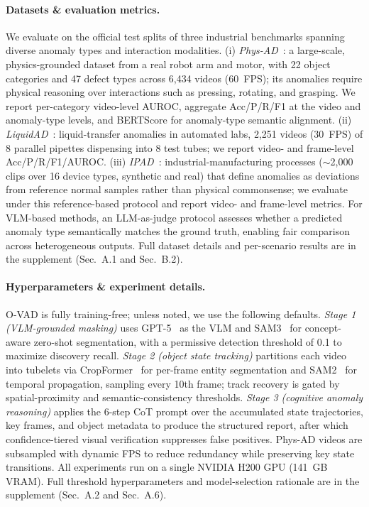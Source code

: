\documentclass[runningheads]{llncs}
\begin{document}
\paragraph{\textbf{Datasets \& evaluation metrics.}}
We evaluate on the official test splits of three industrial benchmarks spanning diverse anomaly types and interaction modalities. (i) \textit{Phys-AD}~\cite{li2025towards}: a large-scale, physics-grounded dataset from a real robot arm and motor, with 22 object categories and 47 defect types across 6,434 videos (60~FPS); its anomalies require physical reasoning over interactions such as pressing, rotating, and grasping. We report per-category video-level AUROC, aggregate Acc/P/R/F1 at the video and anomaly-type levels, and BERTScore for anomaly-type semantic alignment. (ii) \textit{LiquidAD}~\cite{dabouei2025deep}: liquid-transfer anomalies in automated labs, 2,251 videos (30~FPS) of 8 parallel pipettes dispensing into 8 test tubes; we report video- and frame-level Acc/P/R/F1/AUROC. (iii) \textit{IPAD}~\cite{liu2024ipad}: industrial-manufacturing processes ($\sim$2{,}000 clips over 16 device types, synthetic and real) that define anomalies as deviations from reference normal samples rather than physical commonsense; we evaluate under this reference-based protocol and report video- and frame-level metrics. For VLM-based methods, an LLM-as-judge protocol assesses whether a predicted anomaly type semantically matches the ground truth, enabling fair comparison across heterogeneous outputs. Full dataset details and per-scenario results are in the supplement (Sec.~A.1 and Sec.~B.2).



\paragraph{\textbf{Hyperparameters \& experiment details.}}

O-VAD is fully training-free; unless noted, we use the following defaults. \textit{Stage 1 (VLM-grounded masking)} uses GPT-5~\cite{singh2025openai} as the VLM and SAM3~\cite{carion2025sam} for concept-aware zero-shot segmentation, with a permissive detection threshold of 0.1 to maximize discovery recall. \textit{Stage 2 (object state tracking)} partitions each video into tubelets via CropFormer~\cite{qi2022high} for per-frame entity segmentation and SAM2~\cite{ravi2024sam2} for temporal propagation, sampling every 10th frame; track recovery is gated by spatial-proximity and semantic-consistency thresholds. \textit{Stage 3 (cognitive anomaly reasoning)} applies the 6-step CoT prompt over the accumulated state trajectories, key frames, and object metadata to produce the structured report, after which confidence-tiered visual verification suppresses false positives. Phys-AD videos are subsampled with dynamic FPS to reduce redundancy while preserving key state transitions. All experiments run on a single NVIDIA H200 GPU (141~GB VRAM). Full threshold hyperparameters and model-selection rationale are in the supplement (Sec.~A.2 and Sec.~A.6).
\end{document}
